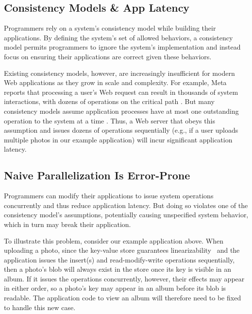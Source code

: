 \subsection{Consistency Models \& App Latency}

Programmers rely on a system’s consistency model while building their applications. By defining the system’s set of allowed behaviors, a consistency model permits programmers to ignore the system’s implementation and instead focus on ensuring their applications are correct given these behaviors.


Existing consistency models, however, are increasingly insufficient for modern Web applications as they grow in scale and complexity. For example, Meta reports that processing a user's Web request can result in thousands of system interactions, with dozens of operations on the critical path \cite{ajoux2015challenges}. But many consistency models assume application processes have at most one outstanding operation to the system at a time \cite{ahamad1995causal,herlihy1990linearizability}. Thus, a Web server that obeys this assumption and issues dozens of operations sequentially
(e.g., if a user uploads multiple photos in our example application)
will incur significant application latency.


\subsection{Naive Parallelization Is Error-Prone}

Programmers can modify their applications to issue system operations concurrently
and thus reduce application latency. But doing so violates one of the consistency
model’s assumptions, potentially causing unspecified system behavior,
which in turn may break their application.

To illustrate this problem, consider our example application above.
When uploading a photo, since the key-value store guarantees
linearizability~\cite{herlihy1990linearizability} and the application issues the
insert(s) and read-modify-write operations sequentially, then a photo’s blob will
always exist in the store once its key is visible in an album.
If it issues the operations concurrently, however, their effects may appear in either order,
so a photo’s key may appear in an album before its blob is readable.
The application code to view an album will therefore need to be fixed to handle this new case.


